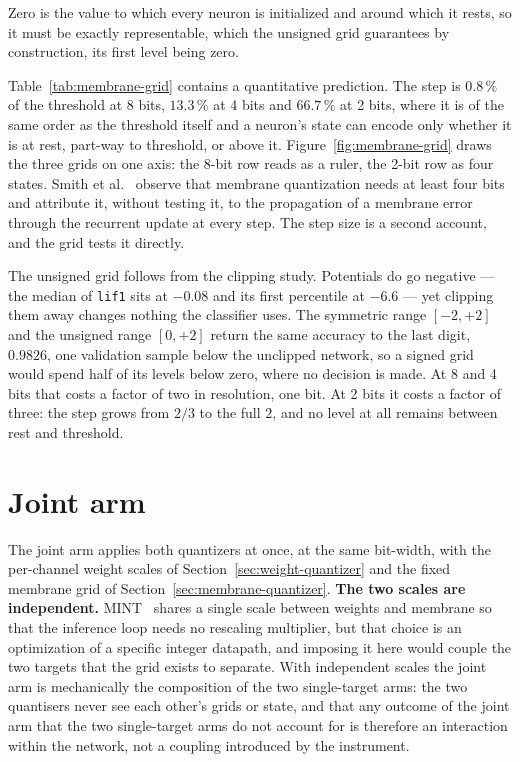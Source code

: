 Zero is the value to which every neuron is initialized and around which it
rests, so it must be exactly representable, which the unsigned grid guarantees
by construction, its first level being zero.

Table~\ref{tab:membrane-grid} contains a quantitative prediction. The step is
$0.8\,\%$ of the threshold at 8 bits, $13.3\,\%$ at 4 bits and $66.7\,\%$ at 2
bits, where it is of the same order as the threshold itself and a neuron's state
can encode only whether it is at rest, part-way to threshold, or above it.
Figure~\ref{fig:membrane-grid} draws the three grids on one axis: the 8-bit row
reads as a ruler, the 2-bit row as four states. Smith et al.~\cite{smith2026}
observe that membrane quantization needs at least four bits and attribute it,
without testing it, to the propagation of a membrane error through the recurrent
update at every step. The step size is a second account, and the grid tests it
directly.

The unsigned grid follows from the clipping study. Potentials do go negative ---
the median of \texttt{lif1} sits at $-0.08$ and its first percentile at $-6.6$
--- yet clipping them away changes nothing the classifier uses. The symmetric
range $[-2, +2]$ and the unsigned range $[0, +2]$ return the same accuracy to the
last digit, $0.9826$, one validation sample below the unclipped network, so a
signed grid would spend half of its levels below zero, where no decision is
made. At 8 and 4 bits that costs a factor of two in resolution, one bit. At 2
bits it costs a factor of three: the step grows from $2/3$ to the full $2$, and
no level at all remains between rest and threshold.

\section{Joint arm}
\label{sec:joint}

The joint arm applies both quantizers at once, at the same bit-width, with the
per-channel weight scales of Section~\ref{sec:weight-quantizer} and the fixed
membrane grid of Section~\ref{sec:membrane-quantizer}. \textbf{The two scales are
independent.} MINT~\cite{yin2024mint} shares a single scale between weights and
membrane so that the inference loop needs no rescaling multiplier, but that choice
is an optimization of a specific integer datapath, and imposing it here would
couple the two targets that the grid exists to separate. With independent scales
the joint arm is mechanically the composition of the two single-target arms:
the two quantisers never see each other's grids or state, and that any outcome
of the joint arm that the two single-target arms do not account for is therefore an interaction
within the network, not a coupling introduced by the instrument.

